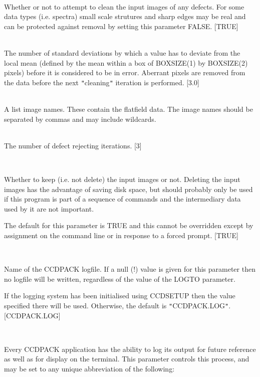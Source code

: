 \documentclass[twoside,11pt]{article}
\newcommand{\htmlref}[2]{#1}
\renewcommand{\_}{\texttt{\symbol{95}}}
\newcommand{\qt}[1]{{\tt "}#1{\tt "}}
\newcommand{\xroutine}[1]{\htmlref{{\sc #1}}{#1}}
\newcommand{\sstsubsection}[1]{ \item[{#1}] \mbox{} \\}
\newcommand{\sstitemlist}[1]{
  \mbox{} \\
  \vspace{-3.5ex}
  \begin{itemize}
     #1
  \end{itemize}
}
\newcommand{\sstsubsection}[1]{\item[{#1}]}
\newcommand{\sstitemlist}[1]{
      \begin{itemize}
         #1
      \end{itemize}
      \\
   }
\begin{document}
{{{      }
      \sstsubsection{
         CLEAN = \_LOGICAL (Read)
      } {
         Whether or not to attempt to clean the input images of any
         defects. For some data types (i.e. spectra) small scale
         strutures and sharp edges may be real and can be protected
         against removal by setting this parameter FALSE.
         [TRUE]
      }
      \sstsubsection{
         GAMMA = \_REAL (Read)
      } {
         The number of standard deviations by which a value has to
         deviate from the local mean (defined by the mean within a box
         of BOXSIZE(1) by BOXSIZE(2) pixels) before it is considered to
         be in error. Aberrant pixels are removed from the data before
         the next \qt{cleaning} iteration is performed.
         [3.0]
      }
      \sstsubsection{
         IN = LITERAL (Read)
      } {
         A list image names. These contain the flatfield data.  The image
         names should be separated by commas and may include wildcards.
      }
      \sstsubsection{
         ITER = \_INTEGER (Read)
      } {
         The number of defect rejecting iterations.
         [3]
      }
      \sstsubsection{
         KEEPIN = \_LOGICAL (Read)
      } {
         Whether to keep (i.e. not delete) the input images or
         not. Deleting the input images has the advantage of saving disk
         space, but should probably only be used if this program is part
         of a sequence of commands and the intermediary data used by
         it are not important.

         The default for this parameter is TRUE and this cannot be
         overridden except by assignment on the command line or in
         response to a forced prompt.
         [TRUE]
      }
      \sstsubsection{
         LOGFILE = FILENAME (Read)
      } {
         Name of the CCDPACK logfile.  If a null (!) value is given for
         this parameter then no logfile will be written, regardless of
         the value of the LOGTO parameter.

         If the logging system has been initialised using \xroutine{CCDSETUP}
         then the value specified there will be used. Otherwise, the
         default is \qt{CCDPACK.LOG}.
         [CCDPACK.LOG]
      }
      \sstsubsection{
         LOGTO = LITERAL (Read)
      } {
         Every CCDPACK application has the ability to log its output
         for future reference as well as for display on the terminal.
         This parameter controls this process, and may be set to any
         unique abbreviation of the following:
         \sstitemlist{

}}}}
\end{document}

